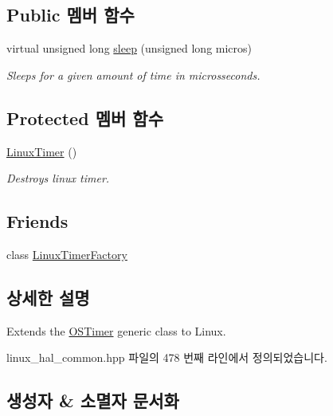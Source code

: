 \subsection*{Public 멤버 함수}
\begin{DoxyCompactItemize}
\item 
virtual unsigned long \hyperlink{class_linux_timer_a94ce67bb2919f7b0b2533430f8ad7647}{sleep} (unsigned long micros)
\begin{DoxyCompactList}\small\item\em Sleeps for a given amount of time in microsseconds. \end{DoxyCompactList}\end{DoxyCompactItemize}
\subsection*{Protected 멤버 함수}
\begin{DoxyCompactItemize}
\item 
\hyperlink{class_linux_timer_a939af8c1292b081ac5b39a6dcb741b9e}{Linux\+Timer} ()
\begin{DoxyCompactList}\small\item\em Destroys linux timer. \end{DoxyCompactList}\end{DoxyCompactItemize}
\subsection*{Friends}
\begin{DoxyCompactItemize}
\item 
class \hyperlink{class_linux_timer_a643283eb62344f961a18246e24061015}{Linux\+Timer\+Factory}
\end{DoxyCompactItemize}


\subsection{상세한 설명}
Extends the \hyperlink{class_o_s_timer}{O\+S\+Timer} generic class to Linux. 

linux\+\_\+hal\+\_\+common.\+hpp 파일의 478 번째 라인에서 정의되었습니다.



\subsection{생성자 \& 소멸자 문서화}

